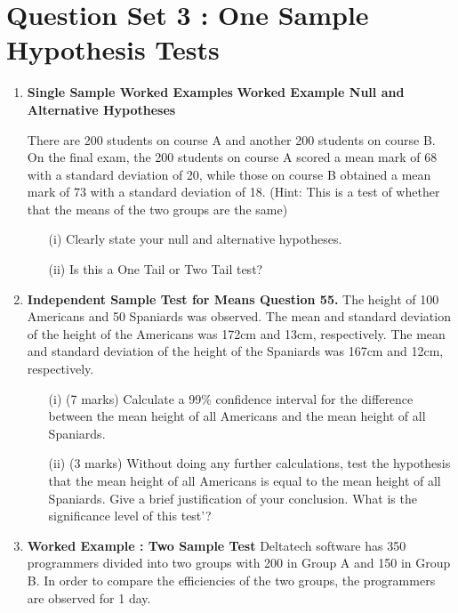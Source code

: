 \documentclass[]{report}
\begin{document}
\section*{Question Set 3 : One Sample Hypothesis Tests}
\begin{enumerate}
	\item \textbf{Single Sample Worked Examples}
	\noindent \textbf{Worked Example Null and Alternative Hypotheses}
	
	There are 200 students on course A and another 200 students on course B.  On the final exam, the 200 students on course A scored a mean mark of 68 with a standard deviation of 20, while those on course B obtained a mean mark of 73 with a standard deviation of 18.  
	(Hint: This is a test of whether that the means of the two groups are the same)
	
	\begin{itemize}
		\item[(i)] Clearly state your null and alternative hypotheses.
		\item[(ii)] Is this a One Tail or Two Tail test?
	\end{itemize}
	
	\item \textbf{Independent Sample Test for Means Question 55. } %
	The height of 100 Americans and 50 Spaniards was observed. The mean and
	standard deviation of the height of the Americans was 172cm and 13cm,
	respectively. The mean and standard deviation of the height of the Spaniards
	was 167cm and 12cm, respectively.
	
	\begin{itemize}
		\item[(i)](7 marks) Calculate a 99\% confidence interval for the difference between the mean height
		of all Americans and the mean height of all Spaniards.
		
		
		\item[(ii)](3 marks) Without doing any further calculations, test the hypothesis that the mean
		height of all Americans is equal to the mean height of all Spaniards. Give a brief
		justification of your conclusion. What is the significance level of this test'?
	\end{itemize}
	
	\item \textbf{Worked Example : Two Sample Test} Deltatech software has 350 programmers divided into two groups with 200 in Group A and 150 in Group B. In order to compare the efficiencies of the two groups, the programmers are observed for  1 day.
	

\end{enumerate}
\end{document}
